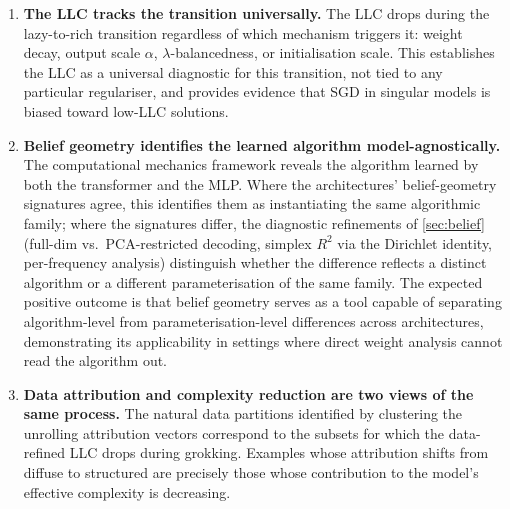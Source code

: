 \documentclass[11pt,a4paper]{article}
\begin{document}
\begin{enumerate}[label=\textbf{\arabic*.}]
    \item \textbf{The LLC tracks the transition universally.} The LLC drops during the lazy-to-rich transition regardless of which mechanism triggers it: weight decay, output scale $\alpha$, $\lambda$-balancedness, or initialisation scale. This establishes the LLC as a universal diagnostic for this transition, not tied to any particular regulariser, and provides evidence that SGD in singular models is biased toward low-LLC solutions.

    \item \textbf{Belief geometry identifies the learned algorithm model-agnostically.} The computational mechanics framework reveals the algorithm learned by both the transformer and the MLP. Where the architectures' belief-geometry signatures agree, this identifies them as instantiating the same algorithmic family; where the signatures differ, the diagnostic refinements of \cref{sec:belief} (full-dim vs.\ PCA-restricted decoding, simplex $R^2$ via the Dirichlet identity, per-frequency analysis) distinguish whether the difference reflects a distinct algorithm or a different parameterisation of the same family. The expected positive outcome is that belief geometry serves as a tool capable of separating algorithm-level from parameterisation-level differences across architectures, demonstrating its applicability in settings where direct weight analysis cannot read the algorithm out.

    \item \textbf{Data attribution and complexity reduction are two views of the same process.} The natural data partitions identified by clustering the unrolling attribution vectors correspond to the subsets for which the data-refined LLC drops during grokking. Examples whose attribution shifts from diffuse to structured are precisely those whose contribution to the model's effective complexity is decreasing.
\end{enumerate}
\end{document}
